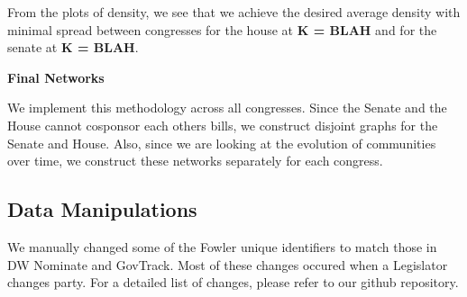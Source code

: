 From the plots of density, we see that we achieve the desired average density 
with minimal spread between congresses for the house at \textbf{K = BLAH} and 
for the senate at \textbf{K = BLAH}.

\textbf{Final Networks}

We implement this methodology across all congresses. Since the Senate and the 
House cannot cosponsor each others bills, we construct disjoint graphs for 
the Senate and House. Also, since we are looking at the evolution of communities 
over time, we construct these networks separately for each congress.

\subsection{Data Manipulations}

We manually changed some of the Fowler unique identifiers to match those in  DW
Nominate and GovTrack. Most of these changes occured when a Legislator  changes
party. For a detailed list of changes, please refer to our github repository.
